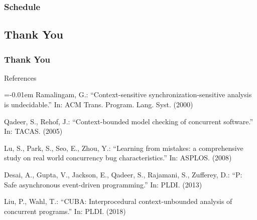 \documentclass[aspectratio=169]{beamer}
\begin{document}
\begin{frame}
  \frametitle{Schedule}
\end{frame}

\subsection*{Thank You}
\begin{frame}
  \frametitle{Thank You}
  \begin{block}{References}
    \vskip4pt
      \small{
      
      \renewcommand{\section}[2]{\vskip 0.05em}
      \begin{thebibliography}{1}\itemsep=-0.01em \setlength{\baselineskip}{0.4em}
       Ramalingam, G.: ``Context-sensitive synchronization-sensitive analysis is undecidable.'' In: ACM
        Trans. Program. Lang. Syst. (2000)

         Qadeer, S., Rehof, J.: ``Context-bounded model checking of concurrent software.'' In: TACAS. (2005)

       Lu, S., Park, S., Seo, E., Zhou, Y.: ``Learning from mistakes: a comprehensive study on real
          world concurrency bug characteristics.'' In: ASPLOS. (2008)

        Desai, A., Gupta, V., Jackson, E., Qadeer, S., Rajamani, S., Zufferey, D.: ``P: Safe asynchronous event-driven programming.'' In: PLDI. (2013)

       Liu, P., Wahl, T.: ``CUBA: Interprocedural context-unbounded analysis of concurrent programs.''
        In: PLDI. (2018)
      \end{thebibliography}}
  \end{block}
\end{frame}
\end{document}
